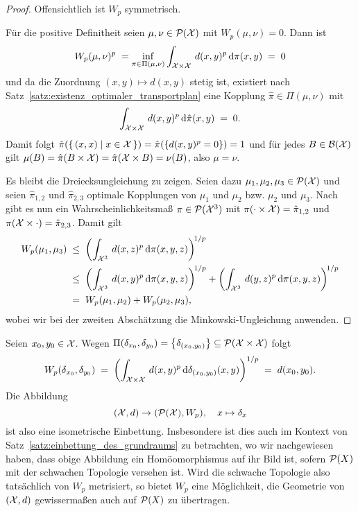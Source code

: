 \documentclass[../thesis/thesis.tex]{subfiles}
\begin{document}
	\begin{proof}
		Offensichtlich ist $W_p$ symmetrisch.
		
		Für die positive Definitheit seien $\mu, \nu \in \mathcal{P}(\mathcal{X})$ mit $W_p(\mu, \nu) = 0$. Dann ist
		\[ W_p(\mu, \nu)^p \; = \inf_{\pi \in \Pi(\mu, \nu)} \int_{\mathcal{X} \times \mathcal{X}} \, d(x, y)^p \, \mathrm{d}\pi(x, y) \; = \; 0 \]
		und da die Zuordnung $(x, y) \mapsto d(x, y)$ stetig ist, existiert nach Satz~\ref{satz:existenz_optimaler_transportplan} eine Kopplung $\hat{\pi} \in \Pi(\mu, \nu)$ mit
		\[ \int_{\mathcal{X} \times \mathcal{X}} \, d(x, y)^p \, \mathrm{d}\hat{\pi}(x, y) \; = \; 0 \text{.} \]
		Damit folgt $\hat{\pi}(\left\{\, (x, x) \; \middle| \; x \in \mathcal{X} \,\right\}) = \hat{\pi}(\left\{d(x, y)^p = 0\right\}) = 1$ und für jedes $B \in \mathcal{B}(\mathcal{X})$ gilt
		$\mu(B) = \hat{\pi}(B \times \mathcal{X}) = \hat{\pi}(\mathcal{X} \times B) = \nu(B)$, also $\mu = \nu$.
		
		Es bleibt die Dreiecksungleichung zu zeigen. Seien dazu $\mu_1, \mu_2, \mu_3 \in \mathcal{P}(\mathcal{X})$ und seien $\hat{\pi}_{1, 2}$ und $\hat{\pi}_{2, 3}$ optimale Kopplungen von
		$\mu_1$ und $\mu_2$ bzw. $\mu_2$ und $\mu_3$. Nach \cite[S. 11-12]{Villani.2009} gibt es nun ein Wahrscheinlichkeitsmaß $\pi \in \mathcal{P}(\mathcal{X}^3)$ mit 
		$\pi(\cdot \times \mathcal{X}) = \hat{\pi}_{1, 2}$ und $\pi(\mathcal{X} \times \cdot) = \hat{\pi}_{2, 3}$. Damit gilt
		\begin{align*}
			W_p(\mu_1, \mu_3) \; &\leq \; \left(\int_{\mathcal{X}^3} \, d(x, z)^p \, \mathrm{d}\pi(x, y, z)\right)^{\! 1/p} \\
			                     &\leq \; \left(\int_{\mathcal{X}^3} \, d(x, y)^p \, \mathrm{d}\pi(x, y, z)\right)^{\! 1/p} + \left(\int_{\mathcal{X}^3} \, d(y, z)^p \, \mathrm{d}\pi(x, y, z)\right)^{\! 1/p} \\
			                     &=    \; W_p(\mu_1, \mu_2) + W_p(\mu_2, \mu_3) \text{,}
		\end{align*}
		wobei wir bei der zweiten Abschätzung die Minkowski-Ungleichung anwenden.
	\end{proof}

	\begin{Bemerkung}
		Seien $x_0, y_0 \in \mathcal{X}$. Wegen $\Pi(\delta_{x_0}, \delta_{y_0}) = \left\{\delta_{(x_0, y_0)}\right\} \subseteq \mathcal{P}(\mathcal{X} \times \mathcal{X})$ folgt
		\[ W_p(\delta_{x_0}, \delta_{y_0}) \; = \; \left( \int_{\mathcal{X} \times \mathcal{X}} \, d(x, y)^p \, \mathrm{d}\delta_{(x_0, y_0)}(x, y) \right)^{1/p} \; = \; d(x_0, y_0) \text{.} \]
		Die Abbildung 
		\[ (\mathcal{X}, d) \to (\mathcal{P}(\mathcal{X}), W_p), \quad x \mapsto \delta_x \]
		ist also eine isometrische Einbettung. Insbesondere ist dies auch im Kontext von Satz~\ref{satz:einbettung_des_grundraums} zu betrachten, wo wir nachgewiesen haben, dass obige Abbildung ein Homöomorphismus auf 
		ihr Bild ist, sofern $\mathcal{P}(X)$ mit der schwachen Topologie versehen ist. Wird die schwache Topologie also tatsächlich von $W_p$ metrisiert, so bietet $W_p$ eine Möglichkeit, die Geometrie von $(\mathcal{X}, d)$ gewissermaßen auch auf $\mathcal{P}(X)$ zu übertragen.
	\end{Bemerkung}
\end{document}
